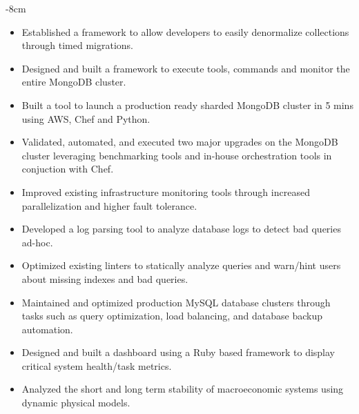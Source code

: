 \documentclass[10pt,a4paper,academicons]{altacv}
\begin{document}

\begin{adjustwidth}{}{-8cm}
\makecvheader
\end{adjustwidth}


\begin{itemize}
\item Established a framework to allow developers to easily denormalize collections through timed migrations.
\item Designed and built a framework to execute tools, commands and monitor the entire MongoDB cluster.
\item Built a tool to launch a production ready sharded MongoDB cluster in 5 mins using AWS, Chef and Python.
\item Validated, automated, and executed two major upgrades on the MongoDB cluster leveraging benchmarking tools and in-house orchestration tools in conjuction with Chef.
\item Improved existing infrastructure monitoring tools through increased parallelization and higher fault tolerance.
\item Developed a log parsing tool to analyze database logs to detect bad queries ad-hoc.
\item Optimized existing linters to statically analyze queries and warn/hint users about missing indexes and bad queries. 
\end{itemize}

\divider

\begin{itemize}
\item Maintained and optimized production MySQL database clusters through tasks such as query optimization, load balancing, and database backup automation.
\item Designed and built a dashboard using a Ruby based framework to display critical system health/task metrics.
\end{itemize}

\divider

\begin{itemize}
\item Analyzed the short and long term stability of macroeconomic systems using dynamic physical models.
\end{itemize}
\end{document}
